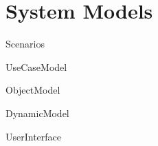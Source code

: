 \section{System Models}

{Scenarios}

{UseCaseModel}

{ObjectModel}

{DynamicModel}

{UserInterface}

